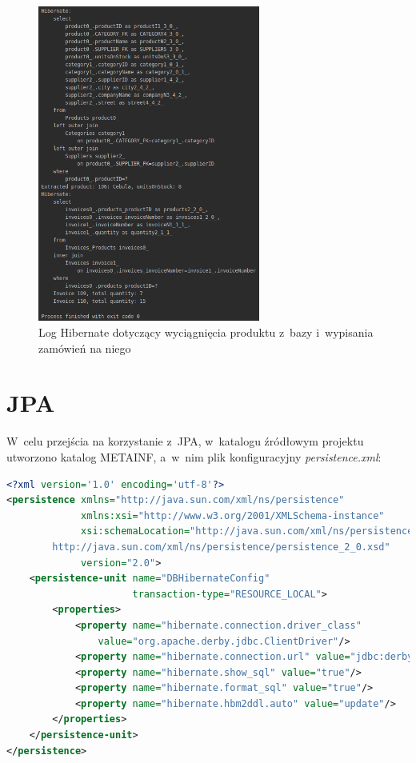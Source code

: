 \documentclass[12pt, a4paper]{mwart}
\begin{document}
\begin{figure}[ht]
  \centering
  \includegraphics[width=0.65\textwidth]{VII/7-5.png}
  \caption{Log Hibernate dotyczący wyciągnięcia produktu z~bazy i~wypisania zamówień na niego}
  \label{rys:7.5}
\end{figure}

\clearpage
\section{JPA}

W~celu przejścia na korzystanie z~JPA, w~katalogu źródłowym projektu utworzono katalog META\dywiz{}INF, a~w~nim plik konfiguracyjny \textit{persistence.xml}:

\begin{lstlisting}[language=XML]
<?xml version='1.0' encoding='utf-8'?>
<persistence xmlns="http://java.sun.com/xml/ns/persistence"
             xmlns:xsi="http://www.w3.org/2001/XMLSchema-instance"
             xsi:schemaLocation="http://java.sun.com/xml/ns/persistence
        http://java.sun.com/xml/ns/persistence/persistence_2_0.xsd"
             version="2.0">
    <persistence-unit name="DBHibernateConfig"
                      transaction-type="RESOURCE_LOCAL">
        <properties>
            <property name="hibernate.connection.driver_class" 
            	value="org.apache.derby.jdbc.ClientDriver"/>
            <property name="hibernate.connection.url" value="jdbc:derby://127.0.0.1/BD_Hibernate"/>
            <property name="hibernate.show_sql" value="true"/>
            <property name="hibernate.format_sql" value="true"/>
            <property name="hibernate.hbm2ddl.auto" value="update"/>
        </properties>
    </persistence-unit>
</persistence>
\end{lstlisting}
\end{document}
